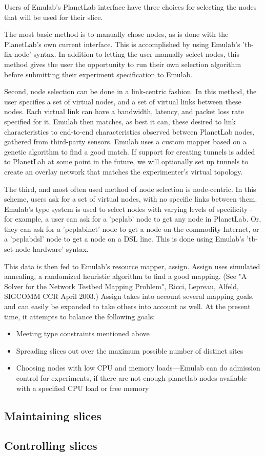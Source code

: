 Users of Emulab's PlanetLab interface have three choices for selecting the
nodes that will be used for their slice.

The most basic method is to manually chose nodes, as is done with the
PlanetLab's own current interface. This is accomplished by using Emulab's
'tb-fix-node' syntax. In addition to letting the user manually select nodes,
this method gives the user the opportunity to run their own selection algorithm
before submitting their experiment specification to Emulab.

Second, node selection can be done in a link-centric fashion. In this method,
the user specifies a set of virtual nodes, and a set of virtual links between
these nodes. Each virtual link can have a bandwidth, latency, and packet loss
rate specified for it. Emulab then matches, as best it can, these desired to
link characteristics to end-to-end characteristics observed between PlanetLab
nodes, gathered from third-party sensors. Emulab uses a custom mapper based on
a genetic algorithm to find a good match. If support for creating tunnels is
added to PlanetLab at some point in the future, we will optionally set up
tunnels to create an overlay network that matches the experimenter's virtual
topology.

The third, and most often used method of node selection is node-centric. In
this scheme, users ask for a set of virtual nodes, with no specific links
between them. Emulab's type system is used to select nodes with varying levels
of specificity - for example, a user can ask for a 'pcplab' node to get any
node in PlanetLab.  Or, they can ask for a 'pcplabinet' node to get a node on
the commodity Internet, or a 'pcplabdsl' node to get a node on a DSL line.
This is done using Emulab's 'tb-set-node-hardware' syntax.

This data is then fed to Emulab's resource mapper, assign. Assign uses
simulated annealing, a randomized heuristic algorithm to find a good mapping.
(See "A Solver for the Network Testbed Mapping Problem", Ricci, Lepreau,
Alfeld, SIGCOMM CCR April 2003.) Assign takes into account several mapping
goals, and can easily be expanded to take others into account as well.  At the
present time, it attempts to balance the following goals:

\begin{itemize}
\item Meeting type constraints mentioned above
\item Spreading slices out over the maximum possible number of distinct sites
\item Choosing nodes with low CPU and memory loads---Emulab can do admission
    control for experiments, if there are not enough planetlab nodes available
    with a specified CPU load or free memory
\end{itemize}

\subsection{Maintaining slices}

\subsection{Controlling slices}
